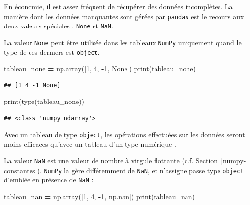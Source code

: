 \documentclass[
  12pt,
]{book}
\newenvironment{Shaded}{\begin{snugshade}}{\end{snugshade}}
\newcommand{\BuiltInTok}[1]{#1}
\newcommand{\DecValTok}[1]{\textcolor[rgb]{0.00,0.00,0.81}{#1}}
\newcommand{\NormalTok}[1]{#1}
\newcommand{\OperatorTok}[1]{\textcolor[rgb]{0.81,0.36,0.00}{\textbf{#1}}}
\newcommand{\VariableTok}[1]{\textcolor[rgb]{0.00,0.00,0.00}{#1}}
\numberwithin{equation}{section}
\numberwithin{countremarque}{section}
\begin{document}
En économie, il est assez fréquent de récupérer des données incomplètes. La manière dont les données manquantes sont gérées par \texttt{pandas} est le recours aux deux valeurs spéciales : \texttt{None} et \texttt{NaN}.

La valeur \texttt{None} peut être utilisée dans les tableaux \texttt{NumPy} uniquement quand le type de ces derniers est \texttt{object}.

\begin{Shaded}
\begin{Highlighting}[]
\NormalTok{tableau\_none }\OperatorTok{=}\NormalTok{ np.array([}\DecValTok{1}\NormalTok{, }\DecValTok{4}\NormalTok{, }\OperatorTok{{-}}\DecValTok{1}\NormalTok{, }\VariableTok{None}\NormalTok{])}
\BuiltInTok{print}\NormalTok{(tableau\_none)}
\end{Highlighting}
\end{Shaded}

\begin{lstlisting}
## [1 4 -1 None]
\end{lstlisting}

\begin{Shaded}
\begin{Highlighting}[]
\BuiltInTok{print}\NormalTok{(}\BuiltInTok{type}\NormalTok{(tableau\_none))}
\end{Highlighting}
\end{Shaded}

\begin{lstlisting}
## <class 'numpy.ndarray'>
\end{lstlisting}

Avec un tableau de type \texttt{object}, les opérations effectuées sur les données seront moins efficaces qu'avec un tableau d'un type numérique \citep[p 121]{vanderplas2016python}.

La valeur \texttt{NaN} est une valeur de nombre à virgule flottante (c.f. Section~\ref{numpy-constantes}). \texttt{NumPy} la gère différemment de \texttt{NaN}, et n'assigne passe type \texttt{object} d'emblée en présence de \texttt{NaN} :

\begin{Shaded}
\begin{Highlighting}[]
\NormalTok{tableau\_nan }\OperatorTok{=}\NormalTok{ np.array([}\DecValTok{1}\NormalTok{, }\DecValTok{4}\NormalTok{, }\OperatorTok{{-}}\DecValTok{1}\NormalTok{, np.nan])}
\BuiltInTok{print}\NormalTok{(tableau\_nan)}
\end{Highlighting}
\end{Shaded}
\end{document}
